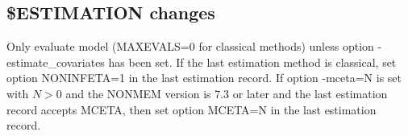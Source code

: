 



\subsection{\$ESTIMATION changes}
Only evaluate model (MAXEVALS=0 for classical methods) unless option -estimate\_covariates has been
set. If the last estimation method is classical, set option NONINFETA=1 in the last estimation record.
If option -mceta=N is set with $N>0$ and the NONMEM version is 7.3 or later and
the last estimation record accepts MCETA, then set option MCETA=N in the last estimation record.
